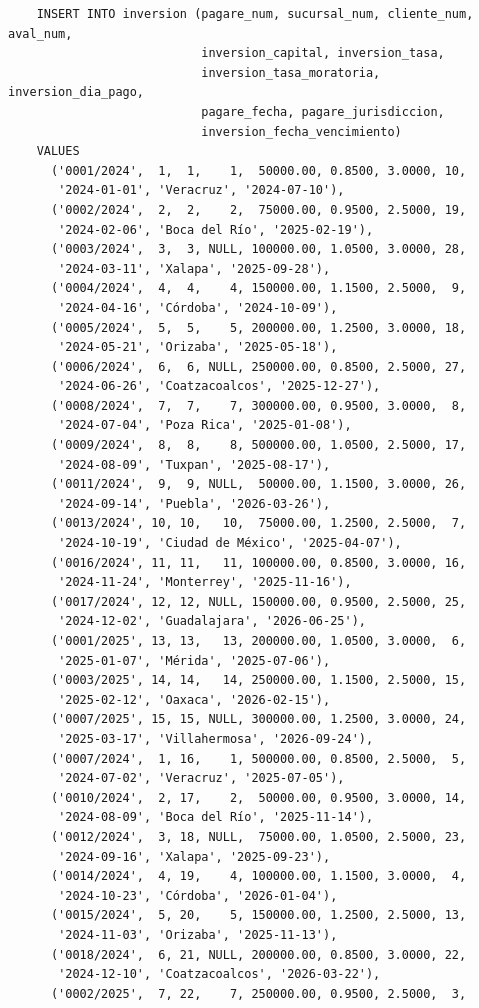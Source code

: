 \begin{verbatim}
	INSERT INTO inversion (pagare_num, sucursal_num, cliente_num, aval_num,
	                       inversion_capital, inversion_tasa,
	                       inversion_tasa_moratoria, inversion_dia_pago,
	                       pagare_fecha, pagare_jurisdiccion,
	                       inversion_fecha_vencimiento)
	VALUES
	  ('0001/2024',  1,  1,    1,  50000.00, 0.8500, 3.0000, 10,
	   '2024-01-01', 'Veracruz', '2024-07-10'),
	  ('0002/2024',  2,  2,    2,  75000.00, 0.9500, 2.5000, 19,
	   '2024-02-06', 'Boca del Río', '2025-02-19'),
	  ('0003/2024',  3,  3, NULL, 100000.00, 1.0500, 3.0000, 28,
	   '2024-03-11', 'Xalapa', '2025-09-28'),
	  ('0004/2024',  4,  4,    4, 150000.00, 1.1500, 2.5000,  9,
	   '2024-04-16', 'Córdoba', '2024-10-09'),
	  ('0005/2024',  5,  5,    5, 200000.00, 1.2500, 3.0000, 18,
	   '2024-05-21', 'Orizaba', '2025-05-18'),
	  ('0006/2024',  6,  6, NULL, 250000.00, 0.8500, 2.5000, 27,
	   '2024-06-26', 'Coatzacoalcos', '2025-12-27'),
	  ('0008/2024',  7,  7,    7, 300000.00, 0.9500, 3.0000,  8,
	   '2024-07-04', 'Poza Rica', '2025-01-08'),
	  ('0009/2024',  8,  8,    8, 500000.00, 1.0500, 2.5000, 17,
	   '2024-08-09', 'Tuxpan', '2025-08-17'),
	  ('0011/2024',  9,  9, NULL,  50000.00, 1.1500, 3.0000, 26,
	   '2024-09-14', 'Puebla', '2026-03-26'),
	  ('0013/2024', 10, 10,   10,  75000.00, 1.2500, 2.5000,  7,
	   '2024-10-19', 'Ciudad de México', '2025-04-07'),
	  ('0016/2024', 11, 11,   11, 100000.00, 0.8500, 3.0000, 16,
	   '2024-11-24', 'Monterrey', '2025-11-16'),
	  ('0017/2024', 12, 12, NULL, 150000.00, 0.9500, 2.5000, 25,
	   '2024-12-02', 'Guadalajara', '2026-06-25'),
	  ('0001/2025', 13, 13,   13, 200000.00, 1.0500, 3.0000,  6,
	   '2025-01-07', 'Mérida', '2025-07-06'),
	  ('0003/2025', 14, 14,   14, 250000.00, 1.1500, 2.5000, 15,
	   '2025-02-12', 'Oaxaca', '2026-02-15'),
	  ('0007/2025', 15, 15, NULL, 300000.00, 1.2500, 3.0000, 24,
	   '2025-03-17', 'Villahermosa', '2026-09-24'),
	  ('0007/2024',  1, 16,    1, 500000.00, 0.8500, 2.5000,  5,
	   '2024-07-02', 'Veracruz', '2025-07-05'),
	  ('0010/2024',  2, 17,    2,  50000.00, 0.9500, 3.0000, 14,
	   '2024-08-09', 'Boca del Río', '2025-11-14'),
	  ('0012/2024',  3, 18, NULL,  75000.00, 1.0500, 2.5000, 23,
	   '2024-09-16', 'Xalapa', '2025-09-23'),
	  ('0014/2024',  4, 19,    4, 100000.00, 1.1500, 3.0000,  4,
	   '2024-10-23', 'Córdoba', '2026-01-04'),
	  ('0015/2024',  5, 20,    5, 150000.00, 1.2500, 2.5000, 13,
	   '2024-11-03', 'Orizaba', '2025-11-13'),
	  ('0018/2024',  6, 21, NULL, 200000.00, 0.8500, 3.0000, 22,
	   '2024-12-10', 'Coatzacoalcos', '2026-03-22'),
	  ('0002/2025',  7, 22,    7, 250000.00, 0.9500, 2.5000,  3,

\end{verbatim}
